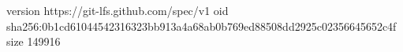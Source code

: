 version https://git-lfs.github.com/spec/v1
oid sha256:0b1cd61044542316323bb913a4a68ab0b769ed88508dd2925c02356645652c4f
size 149916
